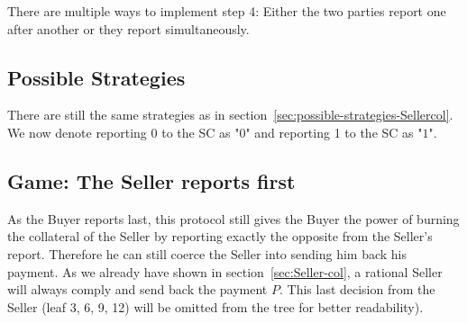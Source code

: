 \documentclass{cacthesis}
\begin{document}
There are multiple ways to implement step 4: Either the two parties report one after another or they report simultaneously.
\subsection{Possible Strategies}
\label{sec:possible-strategies-Sellercol-bothreport}
There are still the same strategies as in section~\ref{sec:possible-strategies-Sellercol}. We now denote reporting 0 to the SC as "$0$" and reporting 1 to the SC as "$1$".
\subsection{Game: The Seller reports first}
As the Buyer reports last, this protocol still gives the Buyer the power of
burning the collateral of the Seller by reporting exactly the opposite from the
Seller's report.
Therefore he can still coerce the Seller into sending him back his payment. As we already have shown in section~\ref{sec:Seller-col}, a rational
Seller will always comply and send back the payment $P$. This last decision from the Seller (leaf 3, 6, 9, 12) will be
omitted from the tree for better readability).\newline
\end{document}
